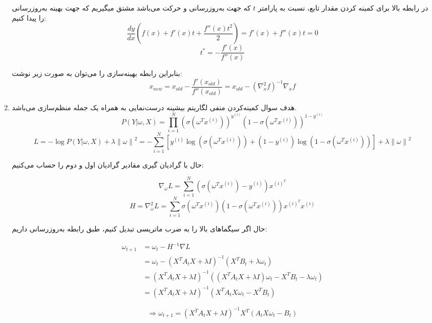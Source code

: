\documentclass{article}
\begin{document}
\begin{enumerate}
	در رابطه بالا برای کمینه کردن مقدار تابع، نسبت به پارامتر $t$ که جهت به‌روزرسانی و حرکت می‌باشد مشتق میگیریم که جهت بهینه به‌روزرسانی را پیدا کنیم:
	$$
	\frac{{dy}}{{dx}}\left( {f\left( x \right) + f'\left( x \right)t + \frac{{f''\left( x \right){t^2}}}{2}} \right) = f'\left( x \right) + f''\left( x \right)t = 0
	$$
	$$
	{t^*} =  - \frac{{f'\left( x \right)}}{{f''\left( x \right)}}
	$$

	بنابراین رابطه بهینه‌سازی را می‌توان به صورت زیر نوشت:
	$$ x_{new} = x_{old} - \frac{f'(x_{old})}{f''(x_{old})} = x_{old} - (\nabla^2_x f)^{-1} \nabla_x f$$
	 
		\item
	
	هدف سوال کمینه‌کردن منفی لگاریتم بیشینه درست‌نمایی به همراه یک جمله منظم‌سازی می‌باشد.
	$$
	P\left( {Y|\omega ,X} \right) = \prod\limits_{i = 1}^N {{{\left( {\sigma \left( {{\omega ^T}{x^{\left( i \right)}}} \right)} \right)}^{{y^{\left( i \right)}}}}{{\left( {1 - \sigma \left( {{\omega ^T}{x^{\left( i \right)}}} \right)} \right)}^{1 - {y^{\left( i \right)}}}}}
	$$
	$$
	L =  - \log P\left( {Y|\omega ,X} \right) + \lambda {\left\| \omega  \right\|^2} =  - \sum\limits_{i = 1}^N {\left[ {{y^{\left( i \right)}}\log \left( {\sigma \left( {{\omega ^T}{x^{\left( i \right)}}} \right)} \right) + \left( {1 - {y^{\left( i \right)}}} \right)\log \left( {1 - \sigma \left( {{\omega ^T}{x^{\left( i \right)}}} \right)} \right)} \right]}  + \lambda {\left\| \omega  \right\|^2}
	$$
	
	حال با گرادیان گیری مقادیر گرادیان اول و دوم را حساب می‌کنیم:
	
	$$
	{\nabla _\omega }L = \sum\limits_{i = 1}^N {\left( {\sigma \left( {{\omega ^T}{x^{\left( i \right)}}} \right) - {y^{\left( i \right)}}} \right){x^{{{\left( i \right)}^T}}}}
	$$
	$$
	H = \nabla _\omega ^2L = \sum\limits_{i = 1}^N {\sigma \left( {{\omega ^T}{x^{\left( i \right)}}} \right)\left( {1 - \sigma \left( {{\omega ^T}{x^{\left( i \right)}}} \right)} \right){x^{{{\left( i \right)}^T}}}{x^{\left( i \right)}}}
	$$
	
	
	حال اگر سیگماهای بالا را به ضرب ماتریسی تبدیل کنیم،‌ طبق رابطه به‌روزرسانی داریم:
	
	$$
	\begin{aligned}
		{\omega _{t + 1}} & = {\omega _t} - {H^{ - 1}}\nabla L\\
		& = {\omega _t} - {\left( {{X^T}{A_t}X + \lambda I} \right)^{ - 1}}\left( {{X^T}{B_t} + \lambda {\omega _t}} \right)\\
		&‌= {\left( {{X^T}{A_t}X + \lambda I} \right)^{ - 1}}\left( {\left( {{X^T}{A_t}X + \lambda I} \right){\omega _t} - {X^T}{B_t} - \lambda {\omega _t}} \right)\\
		&‌= {\left( {{X^T}{A_t}X + \lambda I} \right)^{ - 1}}\left( {{X^T}{A_t}X{\omega _t} - {X^T}{B_t}} \right)
	\end{aligned}
	$$
	
	$$
	\Rightarrow
	{\omega _{t + 1}} = {\left( {{X^T}{A_t}X + \lambda I} \right)^{ - 1}}{X^T}\left( {{A_t}X{\omega _t} - {B_t}} \right)
	$$
	
\end{enumerate}
\fi
\end{document}
